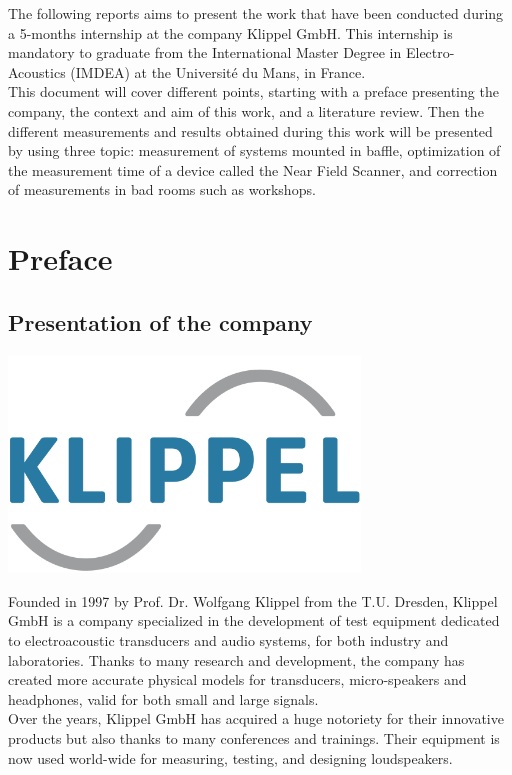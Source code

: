 \documentclass{report}
\begin{document}

The following reports aims to present the work that have been conducted during a 5-months internship at the company Klippel GmbH. This internship is mandatory to graduate from the International Master Degree in Electro-Acoustics (IMDEA) at the Université du Mans, in France. \\

This document will cover different points, starting with a preface presenting the company, the context and aim of this work, and a literature review. Then the different measurements and results obtained during this work will be presented by using three topic: measurement of systems mounted in baffle, optimization of the measurement time of a device called the Near Field Scanner, and correction of measurements in bad rooms such as workshops. 


\chapter{Preface}

    
\section{Presentation of the company}

\begin{minipage}{0.35\textwidth}
\centering
	\includegraphics[width=0.7\textwidth]{Preface/logo_klippel} 
    \captionsetup{hypcap=false} 
	\label{fig:lolo_klippel}
\end{minipage}
\begin{minipage}{0.65\textwidth}
Founded in 1997 by Prof. Dr. Wolfgang Klippel from the T.U. Dresden, Klippel GmbH is a company specialized in the development of test equipment dedicated to electroacoustic transducers and audio systems, for both industry and laboratories. Thanks to many research and development, the company has created more accurate physical models for transducers, micro-speakers and headphones, valid for both small and large signals.  \\
Over the years, Klippel GmbH has acquired a huge notoriety for their innovative products but also thanks to many conferences and trainings. Their equipment is now used world-wide for measuring, testing, and designing loudspeakers.
\end{minipage}
\end{document}
